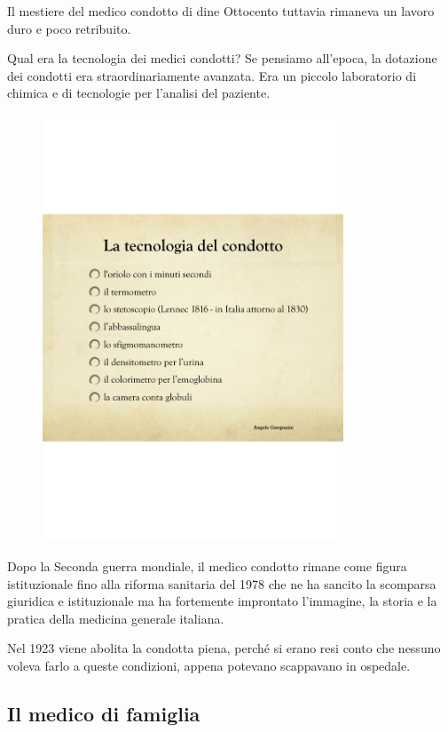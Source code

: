 Il mestiere del medico condotto di dine Ottocento tuttavia rimaneva un
lavoro duro e poco retribuito.

Qual era la tecnologia dei medici condotti? Se pensiamo all'epoca, la
dotazione dei condotti era straordinariamente avanzata. Era un piccolo
laboratorio di chimica e di tecnologie per l'analisi del paziente.

\begin{figure}[!ht]
\centering
	\includegraphics[width=0.8\textwidth]{38/image3.png}
	\end{figure}
	
Dopo la Seconda guerra mondiale, il medico condotto rimane come figura
istituzionale fino alla riforma sanitaria del 1978 che ne ha sancito la
scomparsa giuridica e istituzionale ma ha fortemente improntato
l'immagine, la storia e la pratica della medicina generale italiana.

Nel 1923 viene abolita la condotta piena, perché si erano resi conto che
nessuno voleva farlo a queste condizioni, appena potevano scappavano in
ospedale.

\subsection{Il medico di famiglia}

